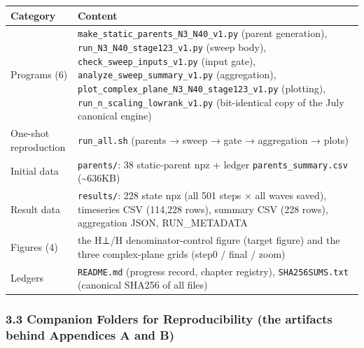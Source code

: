 \documentclass[
  a4paper,
]{ltjsarticle}
\newcounter{none} %
\begin{document}
{\def\LTcaptype{none} %
\begin{longtable}[]{@{}
  >{\raggedright\arraybackslash}p{}
  >{\raggedright\arraybackslash}p{}@{}}
\toprule\noalign{}
\begin{minipage}[b]{\linewidth}\raggedright
Category
\end{minipage} & \begin{minipage}[b]{\linewidth}\raggedright
Content
\end{minipage} \\
\midrule\noalign{}
\endhead
\bottomrule\noalign{}
\endlastfoot
Programs (6) & \texttt{make\_static\_parents\_N3\_N40\_v1.py} (parent
generation), \texttt{run\_N3\_N40\_stage123\_v1.py} (sweep body),
\texttt{check\_sweep\_inputs\_v1.py} (input gate),
\texttt{analyze\_sweep\_summary\_v1.py} (aggregation),
\texttt{plot\_complex\_plane\_N3\_N40\_stage123\_v1.py} (plotting),
\texttt{run\_n\_scaling\_lowrank\_v1.py} (bit-identical copy of the July
canonical engine) \\
One-shot reproduction & \texttt{run\_all.sh} (parents → sweep → gate →
aggregation → plots) \\
Initial data & \texttt{parents/}: 38 static-parent npz + ledger
\texttt{parents\_summary.csv} (\textasciitilde636KB) \\
Result data & \texttt{results/}: 228 state npz (all 501 steps × all
waves saved), timeseries CSV (114,228 rows), summary CSV (228 rows),
aggregation JSON, RUN\_METADATA \\
Figures (4) & the H⊥/H denominator-control figure (target figure) and
the three complex-plane grids (step0 / final / zoom) \\
Ledgers & \texttt{README.md} (progress record, chapter registry),
\texttt{SHA256SUMS.txt} (canonical SHA256 of all files) \\
\end{longtable}
}

\subsubsection{3.3 Companion Folders for Reproducibility (the artifacts
behind Appendices A and
B)}\label{companion-folders-for-reproducibility-the-artifacts-behind-appendices-a-and-b}
\end{document}
